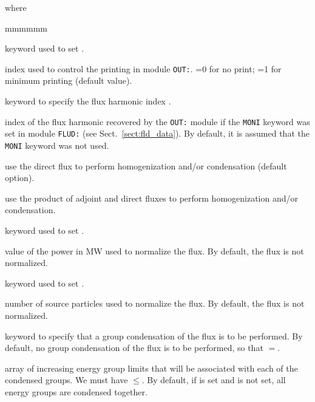 \noindent where
\begin{ListeDeDescription}{mmmmmm}

\item[\moc{EDIT}] keyword used to set .

\item[\dusa{iprint}] index used to control the printing in module {\tt OUT:}. =0 for no print; =1 for minimum printing (default value).

\item[\moc{MODE}] keyword to specify the flux harmonic index .

\item[\dusa{imode}] index of the flux harmonic recovered by the {\tt OUT:} module if the {\tt MONI} keyword was set in module {\tt FLUD:}
(see Sect.~\ref{sect:fld_data}). By default, it is assumed that the {\tt MONI} keyword was not used.

\item[\moc{DIRE}] use the direct flux to perform homogenization and/or condensation (default option).

\item[\moc{PROD}] use the product of adjoint and direct fluxes to perform homogenization and/or condensation.

\item[\moc{POWR}] keyword used to set .

\item[\dusa{power}] value of the power in MW used to normalize the flux. By default, the flux is not normalized.

\item[\moc{SOUR}] keyword used to set .

\item[\dusa{snumb}] number of source particles used to normalize the flux. By default, the flux is not normalized.

\item[\moc{COND}] keyword to specify that a group condensation of the flux is
to be performed. By default, no group condensation of the flux is
to be performed, so that $=$.

\item[\dusa{icond}] array of increasing energy group limits that will be associated with
each of the  condensed groups. We must have $\le$. By default, if  is set
and  is not set, all energy groups are condensed together.


\end{ListeDeDescription}
